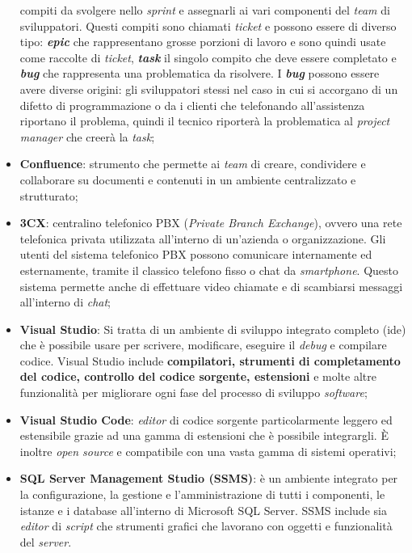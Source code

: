 \begin{itemize}
           compiti da svolgere nello \textit{sprint} e assegnarli ai vari componenti del \textit{team} di sviluppatori. Questi compiti sono chiamati \textit{ticket}
           e possono essere di diverso tipo: \textbf{\textit{epic}} che rappresentano grosse porzioni di lavoro e sono quindi usate come raccolte di \textit{ticket},
           \textbf{\textit{task}} il singolo compito che deve essere completato e \textbf{\textit{bug}} che rappresenta una problematica da risolvere.
           I \textbf{\textit{bug}} possono essere avere diverse origini: gli sviluppatori stessi nel caso in cui si accorgano di un difetto di programmazione o da i 
           clienti che telefonando all'assistenza riportano il problema, quindi il tecnico riporterà la problematica al \textit{project manager} che creerà la \textit{task};
    \item \textbf{Confluence}: strumento che permette ai \textit{team} di creare, condividere e collaborare su documenti e contenuti in un ambiente 
          centralizzato e strutturato;
    \item \textbf{3CX}: centralino telefonico PBX (\textit{Private Branch Exchange}), ovvero una rete telefonica privata utilizzata all'interno di un'azienda 
          o organizzazione. Gli utenti del sistema telefonico PBX possono comunicare internamente ed esternamente, tramite il classico telefono fisso o 
          chat da \textit{smartphone}. Questo sistema permette anche di effettuare video chiamate e di scambiarsi messaggi all'interno di \textit{chat};
    \item \textbf{Visual Studio}: Si tratta di un ambiente di sviluppo integrato completo (\gls{ide}) che è possibile usare per scrivere, modificare, 
          eseguire il \textit{debug} e compilare codice. Visual Studio include \textbf{compilatori, strumenti di completamento del codice, 
          controllo del codice sorgente, estensioni} e molte altre funzionalità per migliorare ogni fase del processo di sviluppo \textit{software};
    \item \textbf{Visual Studio Code}: \textit{editor} di codice sorgente particolarmente leggero ed estensibile grazie ad una gamma di estensioni 
          che è possibile integrargli. È inoltre \textit{open source} e compatibile con una vasta gamma di sistemi operativi;
    \item \textbf{SQL Server Management Studio (SSMS)}: è un ambiente integrato per la configurazione, la gestione e l'amministrazione di tutti i componenti, 
          le istanze e i database all'interno di Microsoft SQL Server. SSMS include sia \textit{editor} di \textit{script} che strumenti grafici che lavorano con 
          oggetti e funzionalità del \textit{server}.
\end{itemize}

